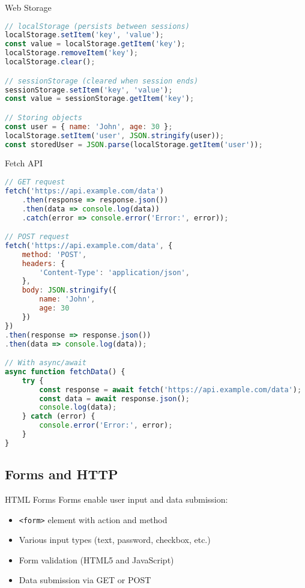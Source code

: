 \begin{KR}{Web Storage}
\begin{lstlisting}[language=JavaScript, style=basesmol]
// localStorage (persists between sessions)
localStorage.setItem('key', 'value');
const value = localStorage.getItem('key');
localStorage.removeItem('key');
localStorage.clear();

// sessionStorage (cleared when session ends)
sessionStorage.setItem('key', 'value');
const value = sessionStorage.getItem('key');

// Storing objects
const user = { name: 'John', age: 30 };
localStorage.setItem('user', JSON.stringify(user));
const storedUser = JSON.parse(localStorage.getItem('user'));
\end{lstlisting}
\end{KR}

\begin{KR}{Fetch API}
\begin{lstlisting}[language=JavaScript, style=basesmol]
// GET request
fetch('https://api.example.com/data')
    .then(response => response.json())
    .then(data => console.log(data))
    .catch(error => console.error('Error:', error));

// POST request
fetch('https://api.example.com/data', {
    method: 'POST',
    headers: {
        'Content-Type': 'application/json',
    },
    body: JSON.stringify({
        name: 'John',
        age: 30
    })
})
.then(response => response.json())
.then(data => console.log(data));

// With async/await
async function fetchData() {
    try {
        const response = await fetch('https://api.example.com/data');
        const data = await response.json();
        console.log(data);
    } catch (error) {
        console.error('Error:', error);
    }
}
\end{lstlisting}
\end{KR}

\subsection{Forms and HTTP}

\begin{definition}{HTML Forms}
    Forms enable user input and data submission:
    \begin{itemize}
        \item \texttt{<form>} element with action and method
        \item Various input types (text, password, checkbox, etc.)
        \item Form validation (HTML5 and JavaScript)
        \item Data submission via GET or POST
    \end{itemize}
\end{definition}

